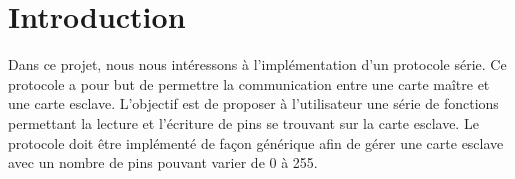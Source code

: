 \section{Introduction}
Dans ce projet, nous nous intéressons à l'implémentation d'un protocole série.
Ce protocole a pour but de permettre la communication entre une carte maître et une carte esclave.
L'objectif est de proposer à l'utilisateur une série de fonctions permettant la lecture et l'écriture de pins se trouvant sur la carte esclave.
Le protocole doit être implémenté de façon générique afin de gérer une carte esclave avec un nombre de pins pouvant varier de 0 à 255.

